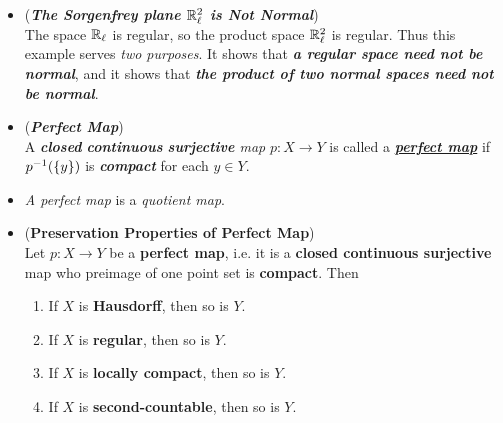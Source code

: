 \documentclass[11pt]{article}
\begin{document}
\begin{itemize}
\begin{example}
To check \emph{\textbf{normality}}, suppose that $A$ and $B$ are \emph{disjoint closed sets} in $\bR_{\ell}$. For each point $a$ of $A$ choose a basis element $[a, x_a)$ \emph{not intersecting} $B$; and for each point $b$ of $B$ choose a basis element $[b, x_b)$ \emph{not intersecting} $A$.
The open sets
\begin{align*}
U = \bigcup_{a\in A}[a, x_a)\quad \text{ and }\quad V = \bigcup_{b \in B}[b, x_b)
\end{align*}
are \emph{\textbf{disjoint open sets}} about $A$ and $B$, respectively. \qed
\end{example}

\item \begin{example} (\emph{\textbf{The Sorgenfrey plane ${\mathbb R}_{\ell}^2$ is Not Normal}})\\
The space $\bR_{\ell}$ is regular, so the product space ${\mathbb R}_{\ell}^2$ is regular. Thus this example serves \emph{two purposes}. It shows that \emph{\textbf{a regular space need not be normal}}, and it shows that \emph{\textbf{the product of two normal spaces need not be normal}}.
\end{example}

\item \begin{definition} (\emph{\textbf{Perfect Map}})\\
A \emph{\textbf{closed} \textbf{continuous} \textbf{surjective} map} $p : X \rightarrow Y$ is called a \underline{\emph{\textbf{perfect map}}} if $p^{-1}(\left\{y\right\})$ is
\emph{\textbf{compact}} for each $y \in Y$.
\end{definition}

\item \begin{remark}
\emph{A perfect map} is a \emph{quotient map}.
\end{remark}

\item \begin{proposition}  (\textbf{Preservation Properties of Perfect Map}) \citep{munkres2000topology}\\
Let $p : X \rightarrow Y$ be a \textbf{perfect map}, i.e. it is a \textbf{closed continuous surjective} map who preimage of one point set is \textbf{compact}. Then
\begin{enumerate}
\item If $X$ is \textbf{Hausdorff}, then so is $Y$.
\item If $X$ is \textbf{regular}, then so is $Y$.
\item If $X$ is \textbf{locally compact}, then so is $Y$.
\item If $X$ is \textbf{second-countable}, then so is $Y$.
\end{enumerate}
\end{proposition}


\end{itemize}
\end{document}
